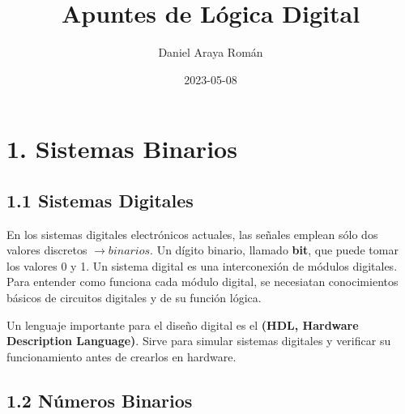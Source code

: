\title{Apuntes de L\'{o}gica Digital}
\date{2023-05-08}
\author{Daniel Araya Rom\'{a}n}

\maketitle
\newpage

\section*{1. Sistemas Binarios}

\paragraph*{} \normalsize

\subsection*{1.1 Sistemas Digitales}

En los sistemas digitales electr\'{o}nicos actuales, las se\~{n}ales emplean
s\'{o}lo dos valores discretos $\rightarrow binarios$. Un d\'{i}gito binario,
llamado \textbf{bit}, que puede tomar los valores 0 y 1. Un sistema digital es
una interconexi\'{o}n de m\'{o}dulos digitales. Para entender como funciona cada
m\'{o}dulo digital, se necesiatan conocimientos b\'{a}sicos de circuitos
digitales y de su funci\'{o}n l\'{o}gica.

Un lenguaje importante para el dise\~{n}o digital es el \textbf{(HDL, Hardware
    Description Language)}. Sirve para simular sistemas digitales y verificar su
funcionamiento antes de crearlos en hardware. \medskip

\begin{center} 
\end{center} \medskip

\subsection*{1.2 N\'{u}meros Binarios}

\paragraph*{} \normalsize

